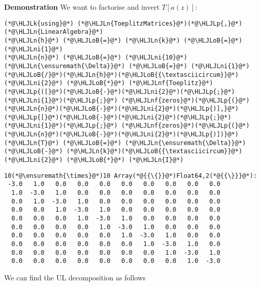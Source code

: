 \documentclass[12pt,a4paper]{article}
\newcommand{\HLJLk}[1]{\textcolor[RGB]{148,91,176}{\textbf{#1}}}
\newcommand{\HLJLn}[1]{#1}
\newcommand{\HLJLnf}[1]{\textcolor[RGB]{66,102,213}{#1}}
\newcommand{\HLJLni}[1]{\textcolor[RGB]{59,151,46}{#1}}
\newcommand{\HLJLoB}[1]{\textcolor[RGB]{102,102,102}{\textbf{#1}}}
\newcommand{\HLJLp}[1]{#1}
\begin{document}
\textbf{Demonstration} We want to factorise and invert $T[a(z)]$:


\begin{lstlisting}
(*@\HLJLk{using}@*) (*@\HLJLn{ToeplitzMatrices}@*)(*@\HLJLp{,}@*) (*@\HLJLn{LinearAlgebra}@*)
(*@\HLJLn{h}@*) (*@\HLJLoB{=}@*) (*@\HLJLn{k}@*) (*@\HLJLoB{=}@*) (*@\HLJLni{1}@*)
(*@\HLJLn{n}@*) (*@\HLJLoB{=}@*) (*@\HLJLni{10}@*)
(*@\HLJLn{\ensuremath{\Delta}}@*) (*@\HLJLoB{=}@*) (*@\HLJLni{1}@*)(*@\HLJLoB{/}@*)(*@\HLJLn{h}@*)(*@\HLJLoB{{\textasciicircum}}@*)(*@\HLJLni{2}@*) (*@\HLJLoB{*}@*) (*@\HLJLnf{Toeplitz}@*)(*@\HLJLp{([}@*)(*@\HLJLoB{-}@*)(*@\HLJLni{2}@*)(*@\HLJLp{;}@*) (*@\HLJLni{1}@*)(*@\HLJLp{;}@*) (*@\HLJLnf{zeros}@*)(*@\HLJLp{(}@*)(*@\HLJLn{n}@*)(*@\HLJLoB{-}@*)(*@\HLJLni{2}@*)(*@\HLJLp{)],}@*) (*@\HLJLp{[}@*)(*@\HLJLoB{-}@*)(*@\HLJLni{2}@*)(*@\HLJLp{;}@*) (*@\HLJLni{1}@*)(*@\HLJLp{;}@*) (*@\HLJLnf{zeros}@*)(*@\HLJLp{(}@*)(*@\HLJLn{n}@*)(*@\HLJLoB{-}@*)(*@\HLJLni{2}@*)(*@\HLJLp{)])}@*)
(*@\HLJLn{T}@*) (*@\HLJLoB{=}@*) (*@\HLJLn{\ensuremath{\Delta}}@*) (*@\HLJLoB{-}@*) (*@\HLJLn{k}@*)(*@\HLJLoB{{\textasciicircum}}@*)(*@\HLJLni{2}@*) (*@\HLJLoB{*}@*) (*@\HLJLn{I}@*)
\end{lstlisting}

\begin{lstlisting}
10(*@\ensuremath{\times}@*)10 Array(*@{{\{}}@*)Float64,2(*@{{\}}}@*):
 -3.0   1.0   0.0   0.0   0.0   0.0   0.0   0.0   0.0   0.0
  1.0  -3.0   1.0   0.0   0.0   0.0   0.0   0.0   0.0   0.0
  0.0   1.0  -3.0   1.0   0.0   0.0   0.0   0.0   0.0   0.0
  0.0   0.0   1.0  -3.0   1.0   0.0   0.0   0.0   0.0   0.0
  0.0   0.0   0.0   1.0  -3.0   1.0   0.0   0.0   0.0   0.0
  0.0   0.0   0.0   0.0   1.0  -3.0   1.0   0.0   0.0   0.0
  0.0   0.0   0.0   0.0   0.0   1.0  -3.0   1.0   0.0   0.0
  0.0   0.0   0.0   0.0   0.0   0.0   1.0  -3.0   1.0   0.0
  0.0   0.0   0.0   0.0   0.0   0.0   0.0   1.0  -3.0   1.0
  0.0   0.0   0.0   0.0   0.0   0.0   0.0   0.0   1.0  -3.0
\end{lstlisting}


We can find the UL decomposition as follows
\end{document}
